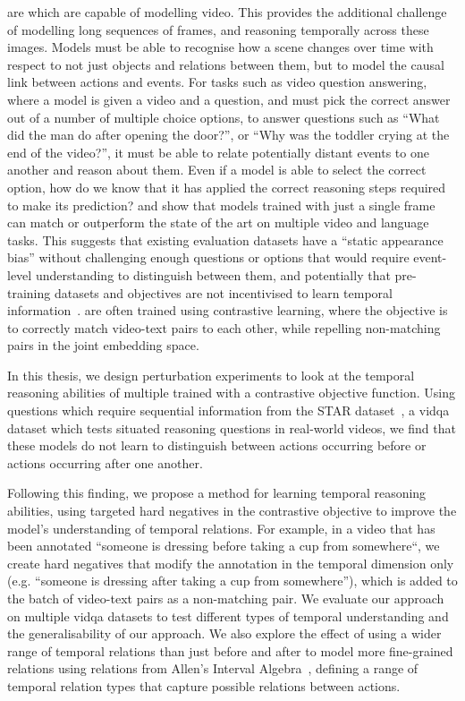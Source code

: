  are  which are capable of modelling video.
This provides the additional challenge of modelling long sequences of frames,
and reasoning temporally across these images. Models must be able to recognise
how a scene changes over time with respect to not just objects and relations
between them, but to model the causal link between actions and events. For
tasks such as video question answering, where a model is given a video and a
question, and must pick the correct answer out of a number of multiple choice
options, to answer questions such as ``What did the man do after opening the
door?'', or ``Why was the toddler crying at the end of the video?'', it must be
able to relate potentially distant events to one another and reason about them.
Even if a model is able to select the correct option, how do we know that it
has applied the correct reasoning steps required to make its prediction?
\citet{lei2023revealing} and \citet{buch2022revisiting} show that models
trained with just a single frame can match or outperform the state of the art
on multiple video and language tasks. This suggests that existing evaluation
datasets have a ``static appearance bias'' without challenging enough questions
or options that would require event-level understanding to distinguish between
them, and potentially that pre-training datasets and objectives are not
incentivised to learn temporal information~\cite{momeni2023verbs}.
 are often trained using contrastive learning, where the
objective is to correctly match video-text pairs to each other, while repelling
non-matching pairs in the joint embedding space.

In this thesis, we design perturbation experiments to look at the temporal
reasoning abilities of multiple  trained with a contrastive
objective function. Using questions which require sequential information from
the STAR dataset~\cite{wu2021star}, a \acrfull{vidqa} dataset which tests
situated reasoning questions in real-world videos, we find that these models do
not learn to distinguish between actions occurring before or actions occurring
after one another.

Following this finding, we propose a method for learning temporal reasoning
abilities, using targeted hard negatives in the contrastive objective to
improve the model's understanding of temporal relations. For example, in a
video that has been annotated ``someone is dressing before taking a cup from
somewhere``, we create hard negatives that modify the annotation in the
temporal dimension only (e.g. ``someone is dressing after taking a cup from
somewhere''), which is added to the batch of video-text pairs as a non-matching
pair. We evaluate our approach on multiple \acrshort{vidqa} datasets to test
different types of temporal understanding and the generalisability of our
approach. We also explore the effect of using a wider range of temporal
relations than just before and after to model more fine-grained relations using
relations from Allen's Interval Algebra~\citep{allen1983interval}, defining a
range of temporal relation types that capture possible relations between
actions.

